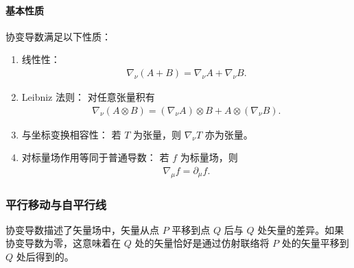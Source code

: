 \paragraph{基本性质}

协变导数满足以下性质：

\begin{enumerate}
  \item 线性性：
  \begin{align}
  \nabla_{\nu} (A + B) = \nabla_{\nu} A + \nabla_{\nu} B.
  \end{align}

  \item Leibniz 法则：
  对任意张量积有
  \begin{align}
  \nabla_{\nu} (A \otimes B) = (\nabla_{\nu} A) \otimes B + A \otimes (\nabla_{\nu} B).
  \end{align}

  \item 与坐标变换相容性：
  若 $T$ 为张量，则 $\nabla_{\nu} T$ 亦为张量。

  
  \item 对标量场作用等同于普通导数：
  若 $f$ 为标量场，则
  \begin{align}
  \nabla_{\mu} f = \partial_{\mu} f.
  \end{align}
\end{enumerate}


\subsubsection{平行移动与自平行线}
协变导数描述了矢量场中，矢量从点 \( P \) 平移到点 \( Q \) 后与 \( Q \) 处矢量的差异。如果协变导数为零，这意味着在 \( Q \) 处的矢量恰好是通过仿射联络将 \( P \) 处的矢量平移到 \( Q \) 处后得到的。

